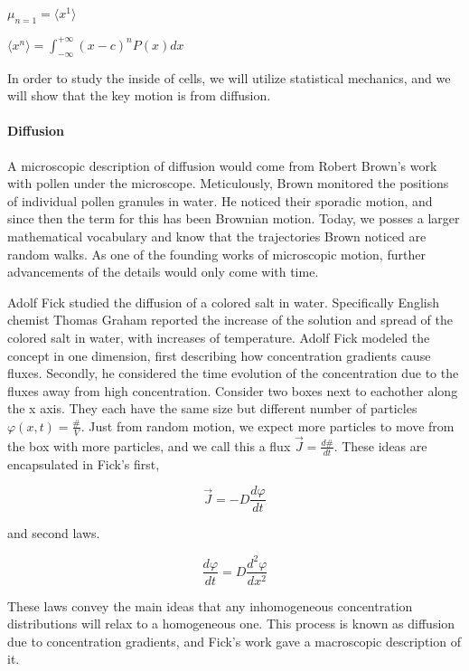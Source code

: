 \documentclass{article}
\begin{document}
$\mu_{n=1} = \langle x^1 \rangle$

$\langle x^n \rangle = \int_{ -\infty}^{+\infty} (x - c)^n P(x) dx$

In order to study the inside of cells, we will utilize statistical mechanics, and we will show that the key motion is from diffusion.

\paragraph{Diffusion}

A microscopic description of diffusion would come from Robert Brown's work with pollen under the microscope. Meticulously, Brown monitored the positions of individual pollen granules in water. He noticed their sporadic motion, and since then the term for this has been Brownian motion. Today, we posses a larger mathematical vocabulary and know that the trajectories Brown noticed are random walks. As one of the founding works of microscopic motion, further advancements of the details would only come with time.

Adolf Fick studied the diffusion of a colored salt in water. Specifically English chemist Thomas Graham reported the increase of the solution and spread of the colored salt in water, with increases of temperature. Adolf Fick modeled the concept in one dimension, first describing how concentration gradients cause fluxes. Secondly, he considered the time evolution of the concentration due to the fluxes away from high concentration. Consider two boxes next to eachother along the x axis. They each have the same size but different number of particles $\varphi(x, t) = \frac{\#}{V}$. Just from random motion, we expect more particles to move from the box with more particles, and we call this a flux $\vec{J} = \frac{d\#}{dt}$. These ideas are encapsulated in Fick's first,

\begin{equation}
\vec{J} = -D \frac{d\varphi}{dt}
\end{equation}

and second laws.

\begin{equation}
\frac{d\varphi}{dt} = D \frac{d^2\varphi}{dx^2}
\end{equation}

These laws convey the main ideas that any inhomogeneous concentration distributions will relax to a homogeneous one. This process is known as diffusion due to concentration gradients, and Fick's work gave a macroscopic description of it.
\end{document}
